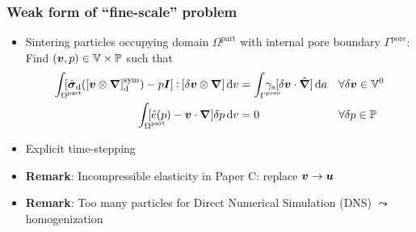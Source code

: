 \documentclass[11pt]{beamer} %
\renewcommand{\dev}{\mathrm{d}}
\newcommand{\external}{\mathrm{ext}}
\newcommand{\surf}{\mathrm{s}}
\newcommand{\pore}{\mathrm{pore}}
\newcommand{\particle}{\mathrm{part}}
\renewcommand{\alert}[1]{\textbf{#1}}
\begin{document}
\begin{frame}
 \frametitle{Weak form of ``fine-scale'' problem}
 \begin{itemize}
  \item Sintering particles occupying domain $\Omega^\particle$ with internal pore boundary $\Gamma^\pore$:
Find $(\boldsymbol{v},p)\in \mathbb{V} \times \mathbb{P}$ such that
\begin{align*}
  \int_{\mathrlap{\Omega^\particle}} \;[\hat{\ts\sigma}_\dev([\ta v\outerp\diff]_\dev^\sym)-p\ts I]\dprod[\delta\ta v\outerp\ta\nabla]\dif v &=
   \int_{\mathrlap{\Gamma^\pore}} \;\gamma_\surf[\delta\ta v\cdot\hat{\ta\nabla}] \dif a
    && \forall \delta \ta v\in \set V^0
\\
  \int_{\mathrlap{\Omega^\particle}} \;[\hat{e}(p) - \ta v\cdot\ta\nabla]\delta p \dif v &= 0 && \forall \delta p\in \set P
\end{align*}

 \item Explicit time-stepping
 \item \alert{Remark}: Incompressible elasticity in Paper C: replace $\boldsymbol{v} \to \boldsymbol{u}$
 \item \alert{Remark}: Too many particles for Direct Numerical Simulation (DNS) $\leadsto$ homogenization
 \end{itemize}
\end{frame}
\end{document}
